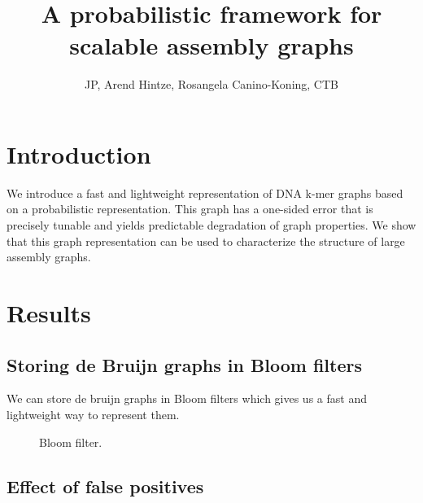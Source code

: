 \documentclass[12pt]{article} \usepackage{simplemargins}
\begin{document}
\title{A probabilistic framework for scalable assembly graphs}
\author{JP, Arend Hintze, Rosangela Canino-Koning, CTB}

\maketitle

\section{Introduction}

We introduce a fast and lightweight representation of DNA k-mer graphs
based on a probabilistic representation.  This graph has a one-sided
error that is precisely tunable and yields predictable degradation of
graph properties.  We show that this graph representation can be used
to characterize the structure of large assembly graphs.

\section{Results}

\subsection{Storing de Bruijn graphs in Bloom filters}

We can store de bruijn graphs in Bloom filters which gives us a fast and lightweight way to represent them.

\begin{figure}
\caption{Bloom filter.}
\end{figure}

\subsection{Effect of false positives}
\end{document}
